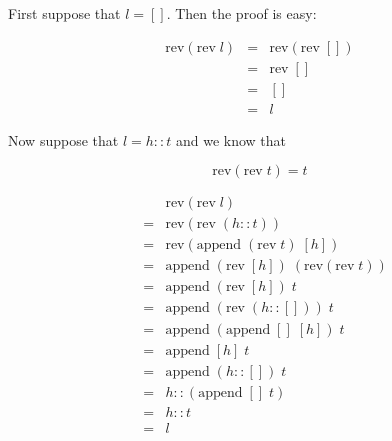 \begin{slide*}


\vspace*{0.5cm}

First suppose that {\red $l = []$}. Then the proof is easy:

{\red
\begin{eqnarray*}
\mbox{rev}(\mbox{rev}\; l)
& = & \mbox{rev}(\mbox{rev}\; [])                               \\
& = & \mbox{rev}\; []                                               \\
& = & []                                                                \\
& = & l
\end{eqnarray*}
}

Now suppose that {\red $l = h::t$} and we know that

{\red $$ \mbox{rev}(\mbox{rev}\; t) = t $$}

\end{slide*}

\begin{slide*}


\vspace*{0.5cm}

{\red
\begin{eqnarray*}
& & \mbox{rev}(\mbox{rev}\; l)                                  \\
& = & \mbox{rev}(\mbox{rev}\; (h::t))                           \\
& = & \mbox{rev}(\mbox{append}\; (\mbox{rev}\; t)\; [h])        \\
& = & \mbox{append}\; (\mbox{rev}\; [h])\; (\mbox{rev} (\mbox{rev}\; t)) \\
& = & \mbox{append}\; (\mbox{rev}\; [h])\; t                        \\
& = & \mbox{append}\; (\mbox{rev}\; (h::[]))\; t                    \\
& = & \mbox{append}\; (\mbox{append}\; []\; [h])\; t                    \\
& = & \mbox{append}\; [h]\; t                                           \\
& = & \mbox{append}\; (h::[])\; t                                       \\
& = & h::(\mbox{append}\; []\; t)                                       \\
& = & h::t                                                              \\
& = & l
\end{eqnarray*}}

\end{slide*}


